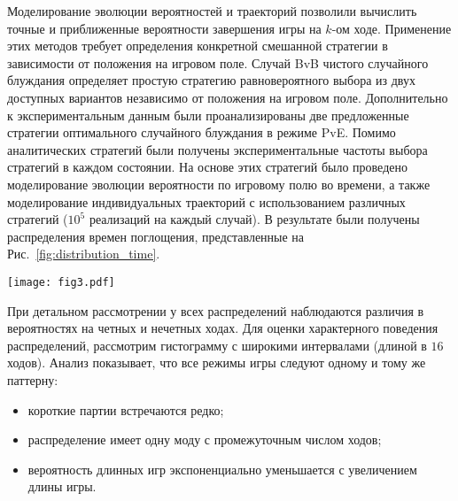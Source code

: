Моделирование эволюции вероятностей и траекторий позволили вычислить точные и приближенные вероятности завершения игры на $k$-ом ходе. Применение этих методов требует определения конкретной смешанной стратегии в зависимости от положения на игровом поле. Случай BvB чистого случайного блуждания определяет простую стратегию равновероятного выбора из двух доступных вариантов независимо от положения на игровом поле. Дополнительно к экспериментальным данным были проанализированы две предложенные стратегии оптимального случайного блуждания в режиме PvE. Помимо аналитических стратегий были получены экспериментальные частоты выбора стратегий в каждом состоянии. На основе этих стратегий было проведено моделирование эволюции вероятности по игровому полю во времени, а также моделирование индивидуальных траекторий с использованием различных стратегий ($10^5$ реализаций на каждый случай). В результате были получены распределения времен поглощения, представленные на Рис.~\cref{fig:distribution_time}.

\begin{figure*}[t]
    \centering
    \texttt{[image: fig3.pdf]}
    \caption{
        Распределение количества ходов, полученное моделированием эволюции вероятности (сплошная линия) и численным моделированием (точки) с использованием соответствующих стратегий игроков A и B. Режим BvB (красная линия) представляет собой равновероятный выбор для обоих игроков. Кривые PvE (зеленый и синий) и PvP-режим (фиолетовая линия) были построены на основе соответствующих усредненных стратегий по популяции. Противоположная стратегия в режиме PvE -- это стратегия равновероятного выбора. Оптимальная стратегия для режима PvE в центре (зеленая пунктирная линия) -- держать фишку на диагональной лестнице. Оптимальная стратегия для режима границы PvE (синяя пунктирная линия) -- выбирать движения только вдоль горизонтальной линии. Гистограммы, полученные экспериментально, представлены для режимов PvE (зеленая и синяя области).
    }  
    \label{fig:distribution_time}
    
\end{figure*}

При детальном рассмотрении у всех распределений наблюдаются различия в вероятностях на четных и нечетных ходах. Для оценки характерного поведения распределений, рассмотрим гистограмму с широкими интервалами (длиной в $16$ ходов). Анализ показывает, что все режимы игры следуют одному и тому же паттерну:
\begin{itemize}
\item короткие партии встречаются редко;
\item распределение имеет одну моду с промежуточным числом ходов;
\item вероятность длинных игр экспоненциально уменьшается с увеличением длины игры.
\end{itemize}

